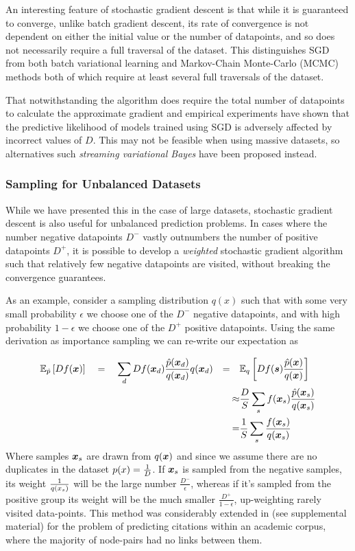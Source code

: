An interesting feature of stochastic gradient descent is that while it is guaranteed to converge, unlike batch gradient descent, its rate of convergence is not dependent on either the initial value or the number of datapoints, and so does not necessarily require a full traversal of the dataset\cite{Bottou2008}. This distinguishes SGD from both batch variational learning and Markov-Chain Monte-Carlo (MCMC) methods both of which require at least several full traversals of the dataset.

That notwithstanding the algorithm does require the total number of datapoints to calculate the approximate gradient and empirical experiments have shown\cite{Broderick2013} that the predictive likelihood of models trained using SGD is adversely affected by incorrect values of $D$. This may not be feasible when using massive datasets, so alternatives such \emph{streaming variational Bayes}\cite{Broderick2013} have been proposed instead.


\subsubsection*{Sampling for Unbalanced Datasets}
While we have presented this in the case of large datasets, stochastic gradient descent is also useful for unbalanced prediction problems. In cases where the number negative datapoints $D^-$ vastly outnumbers the number of positive datapoints $D^+$, it is possible to develop a \emph{weighted} stochastic gradient algorithm such that relatively few negative datapoints are visited, without breaking the convergence guarantees. 

As an example, consider a sampling distribution $q(x)$ such that with some very small probability $\epsilon$ we choose one of the $D^-$ negative datapoints, and with high probability $1 - \epsilon$ we choose one of the $D^+$ positive datapoints. Using the same derivation as importance sampling we can re-write our expectation as

\begin{align}
\ex{D f(\vv{x})}{\hat{p}} \quad
&= \quad \sum_d D f(\xd) \frac{\hat{p}(\xd)}{q(\xd)} q(\xd) 
& = \quad & \ex{D f(\vv{s}) \frac{\hat{p}(\vv{x})}{q(\vv{x})}}{q} \\
& & \approx & \frac{D}{S} \sum_s f(\vv{x}_s) \frac{\hat{p}(\vv{x}_s)}{q(\vv{x}_s)} \\
& & = & \frac{1}{S} \sum_s \frac{f(\vv{x}_s)}{q(\vv{x}_s)}
\end{align}
Where samples $\vv{x}_s$ are drawn from $q(\vv{x})$ and since we assume there are no duplicates in the dataset $p(x) = \oneover{D}$. If $\vv{x}_s$ is sampled from the negative samples, its weight $\oneover{q(x_s)}$ will be the large number $\frac{D^-}{\epsilon}$, whereas if it's sampled from the positive group its weight will be the much smaller $\frac{D^+}{1 - \epsilon}$, up-weighting rarely visited data-points. This method was considerably extended in \cite{Gopalan2013b} (see supplemental material) for the problem of predicting citations within an academic corpus, where the majority of node-pairs had no links between them.



